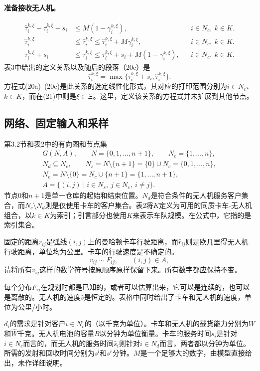 \documentclass[10pt]{article}
\begin{document}
\paragraph{准备接收无人机。}
\begin{align}
\hat\tau_i^{k,\xi}-\tau_i^{k,\xi}-s_i&\leq M(1-\gamma_i^{k,\xi}),
&&i\in N_c,\ k\in K.\tag{20a}\\
\hat\tau_i^{k,\xi}&\leq\bar\tau_i^{k,\xi}\leq\hat\tau_i^{k,\xi}+M\gamma_i^{k,\xi},
&&i\in N_c,\ k\in K.\tag{20b}\\
\tau_i^{k,\xi}+s_i&\leq\bar\tau_i^{k,\xi}\leq\tau_i^{k,\xi}+s_i+M(1-\gamma_i^{k,\xi}),
&&i\in N_c,\ k\in K.\tag{20c}
\end{align}
\noindent 表3中给出的定义关系以及随后的段落（20c）是
\[
\bar\tau_i^{k,\xi}=\max\{\tau_i^{k,\xi}+s_i,\hat\tau_i^{k,\xi}\}.
\]
方程式(20a)–(20c)是此关系的选定线性化形式，其对应的打印范围分别为$i\in N_c$、$k\in K$，而在(21)中则是$\xi\in\Xi$。这里，定义该关系的方程式并未扩展到其他节点。

\subsection*{网络、固定输入和采样}
第3.2节和表2中的有向图和节点集
\[
\begin{gathered}
G(N,A),\qquad N=\{0,1,\ldots,n+1\},\qquad N_c=\{1,\ldots,n\},\\
N_d\subseteq N_c,\qquad
N_s=N\setminus\{n+1\}=\{0\}\cup N_c=\{0,1,\ldots,n\},\\
N_e=N\setminus\{0\}=N_c\cup\{n+1\}=\{1,\ldots,n+1\},\\
A=\{(i,j)\mid i\in N_s,\ j\in N_e,\ i\ne j\}.
\end{gathered}
\]
节点$0$和$n+1$是单一仓库的起始和结束位置。$N_d$是符合条件的无人机服务客户集合，而$N_c\setminus N_d$则是仅使用卡车的客户集合。表2将$K$定义为可用的同质卡车-无人机组合，以$k\in K$为索引；引言部分也使用$K$来表示车队规模。在公式中，它指的是索引集合。

固定的距离$r_{ij}$是弧线$(i,j)$上的曼哈顿卡车行驶距离，而$\hat r_{ij}$则是欧几里得无人机行驶距离，单位均为公里。卡车的行驶速度是不确定的。
\[
v_{ij}\sim F_{ij},\qquad (i,j)\in A,
\]
请将所有$v_{ij}$这样的数学符号按原顺序原样保留下来。所有数字都应保持不变。

每个分布$F_{ij}$在规划时都是已知的，或者可以估算出来，它可以是连续的，也可以是离散的。无人机的速度$\hat v$是恒定的。表格中同时给出了卡车和无人机的速度，单位为公里/小时。

$d_i$的需求是针对客户$i\in N_c$的（以千克为单位）。卡车和无人机的载货能力分别为$W$和$\hat W$千克。无人机电池的容量$B$以分钟为单位衡量。卡车的服务时间$s_i$是针对$i\in N_c$而言的，而无人机的服务时间$\hat s_i$则针对$i\in N_d$而言，两者都以分钟为单位。所需的发射和回收时间分别为$s^l$和$s^r$分钟。$M$是一个足够大的数字，由模型直接给出，未作详细说明。
\end{document}
